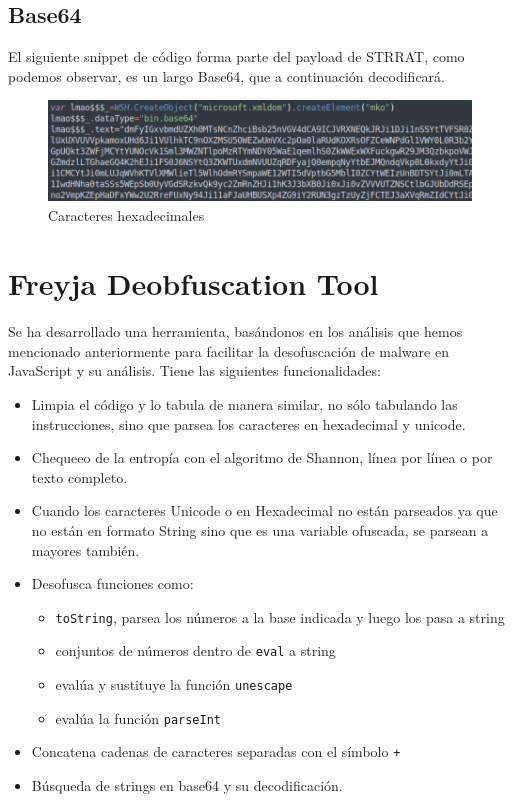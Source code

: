 \documentclass[15pt]{article}
\begin{document}
	\subsection{Base64}
	El siguiente snippet de código forma parte del payload de STRRAT\cite{javascript_malware}, como podemos observar, es un largo Base64, que a continuación decodificará.
	
	\begin{figure}[H]
		\centering
		\includegraphics[width=15cm]{images/base64.png}
		\caption{Caracteres hexadecimales}
	\end{figure}
	
	
	\newpage
	\section{Freyja Deobfuscation Tool}
	Se ha desarrollado una herramienta, basándonos en los análisis que hemos mencionado anteriormente para facilitar la desofuscación de malware en JavaScript y su análisis. Tiene las siguientes funcionalidades:
	
	\begin{itemize}
		\item Limpia el código y lo tabula de manera similar, no sólo tabulando las instrucciones, sino que parsea los caracteres en hexadecimal y unicode.
		\item Chequeeo de la entropía con el algoritmo de Shannon, línea por línea o por texto completo.
		\item Cuando los caracteres Unicode o en Hexadecimal no están parseados ya que no están en formato String sino que es una variable ofuscada, se parsean a mayores también.
		\item Desofusca funciones como:
		\begin{itemize}
			\item \verb*|toString|, parsea los números a la base indicada y luego los pasa a string
			\item conjuntos de números dentro de \verb*|eval| a string
			\item evalúa y sustituye la función \verb*|unescape|
			\item evalúa la función \verb*|parseInt|
		\end{itemize}
		\item Concatena cadenas de caracteres separadas con el símbolo \verb*|+|
		\item Búsqueda de strings en base64 y su decodificación.
	\end{itemize}
	
\end{document}
